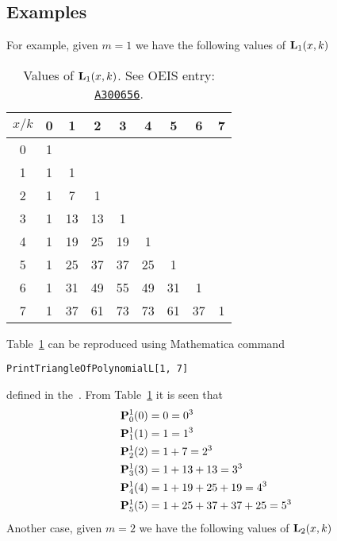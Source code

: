\subsection{Examples} \label{subsec:examples}
For example, given $m=1$ we have the following values of ${\mathbf{L}}\sb{1}(x,k)$
\begin{table}[H]
    \begin{tabular}{c|cccccccc}
        $x/k$ & 0 & 1  & 2  & 3  & 4  & 5  & 6  & 7 \\[3px]
        \hline
        0     & 1 &    &    &    &    &    &    &   \\
        1     & 1 & 1  &    &    &    &    &    &   \\
        2     & 1 & 7  & 1  &    &    &    &    &   \\
        3     & 1 & 13 & 13 & 1  &    &    &    &   \\
        4     & 1 & 19 & 25 & 19 & 1  &    &    &   \\
        5     & 1 & 25 & 37 & 37 & 25 & 1  &    &   \\
        6     & 1 & 31 & 49 & 55 & 49 & 31 & 1  &   \\
        7     & 1 & 37 & 61 & 73 & 73 & 61 & 37 & 1
    \end{tabular}
    \caption{Values of ${\mathbf{L}}\sb{1}(x,k)$. See OEIS entry: \href{https://oeis.org/A300656}{\texttt{A300656}}.}
    \label{tab:tab_3}
\end{table}
Table~\ref{tab:tab_3} can be reproduced using Mathematica command
\begin{center}
    \texttt{PrintTriangleOfPolynomialL[1, 7]}
\end{center}
defined in the~\cite{github_source_files}.
From Table~\ref{tab:tab_3} it is seen that
\begin{equation*}
    \begin{split}
        {\mathbf{P}}\sp{1} \sb{0}(0) &= 0 = 0^3 \\
        {\mathbf{P}}\sp{1} \sb{1}(1) &= 1 = 1^3 \\
        {\mathbf{P}}\sp{1} \sb{2}(2) &= 1+7 = 2^3 \\
        {\mathbf{P}}\sp{1} \sb{3}(3) &= 1+13+13 = 3^3 \\
        {\mathbf{P}}\sp{1} \sb{4}(4) &= 1+19+25+19 = 4^3 \\
        {\mathbf{P}}\sp{1} \sb{5}(5) &= 1+25+37+37+25 = 5^3
    \end{split}
\end{equation*}
Another case, given $m=2$ we have the following values of ${\mathbf{L}}\sb{2}(x,k)$
